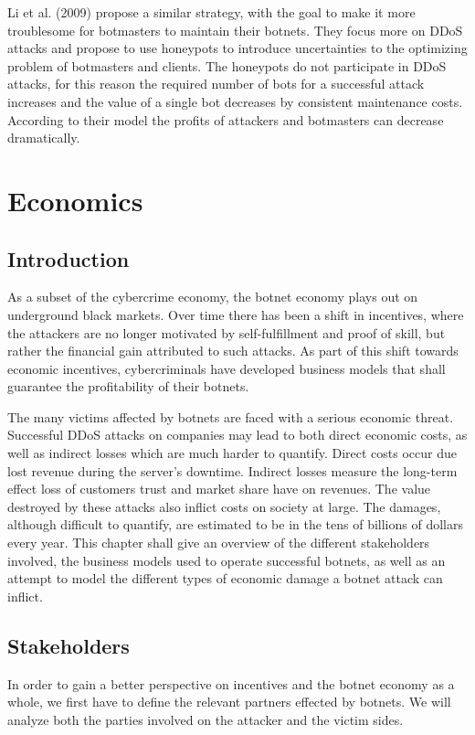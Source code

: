 Li et al. (2009) propose a similar strategy, with the goal to make it more troublesome for botmasters to maintain their botnets. They focus more on DDoS attacks and propose to use honeypots to introduce uncertainties to the optimizing problem of botmasters and clients. The honeypots do not participate in DDoS attacks, for this reason the required number of bots for a successful attack increases and the value of a single bot decreases by consistent maintenance costs. According to their model the profits of attackers and botmasters can decrease dramatically.  \cite{Li09}

\section{Economics}
	\subsection{Introduction}
	As a subset of the cybercrime economy, the botnet economy plays out on underground black markets. Over time there has been a shift in incentives, where the attackers are no longer motivated by self-fulfillment and proof of skill, but rather the financial gain attributed to such attacks. As part of this shift towards economic incentives, cybercriminals have developed business models that shall guarantee the profitability of their botnets. \cite{Li09}

The many victims affected by botnets are faced with a serious economic threat. Successful DDoS attacks on companies may lead to both direct economic costs, as well as indirect losses which are much harder to quantify. Direct costs occur due lost revenue during the server's downtime. Indirect losses measure the long-term effect loss of customers trust and market share have on revenues. The value destroyed by these attacks also inflict costs on society at large. The damages, although difficult to quantify, are estimated to be in the tens of billions of dollars every year. \cite{Asghari15}
This chapter shall give an overview of the different stakeholders involved, the business models used to operate successful botnets, as well as an attempt to model the different types of economic damage a botnet attack can inflict. 

	\subsection{Stakeholders}
			In order to gain a better perspective on incentives and the botnet economy as a whole, we first have to define the relevant partners effected by botnets. We will analyze both the parties involved on the attacker and the victim sides.
			
